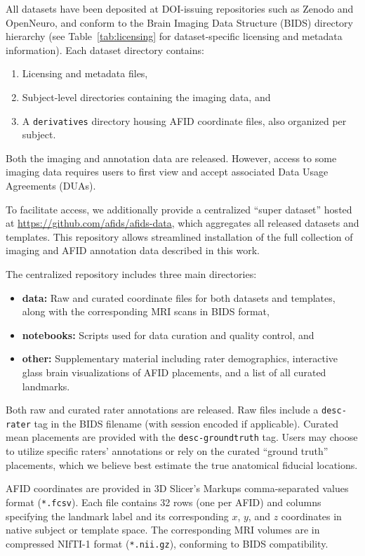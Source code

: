 All datasets have been deposited at DOI-issuing repositories such as Zenodo and OpenNeuro\cite{zenodo,openneuro1,openneuro2,openneuro3}, and conform to the Brain Imaging Data Structure (BIDS) directory hierarchy (see Table~\ref{tab:licensing} for dataset-specific licensing and metadata information). Each dataset directory contains: 
\begin{enumerate}
    \item Licensing and metadata files,
    \item Subject-level directories containing the imaging data, and
    \item A \texttt{derivatives} directory housing AFID coordinate files, also organized per subject.
\end{enumerate}
Both the imaging and annotation data are released. However, access to some imaging data requires users to first view and accept associated Data Usage Agreements (DUAs).

To facilitate access, we additionally provide a centralized “super dataset” hosted at \url{https://github.com/afids/afids-data}\cite{afidsdata}, which aggregates all released datasets and templates. This repository allows streamlined installation of the full collection of imaging and AFID annotation data described in this work.

The centralized repository includes three main directories:
\begin{itemize}
    \item \textbf{data:} Raw and curated coordinate files for both datasets and templates, along with the corresponding MRI scans in BIDS format,
    \item \textbf{notebooks:} Scripts used for data curation and quality control, and
    \item \textbf{other:} Supplementary material including rater demographics, interactive glass brain visualizations of AFID placements, and a list of all curated landmarks.
\end{itemize}

Both raw and curated rater annotations are released. Raw files include a \texttt{desc-rater} tag in the BIDS filename (with session encoded if applicable). Curated mean placements are provided with the \texttt{desc-groundtruth} tag. Users may choose to utilize specific raters’ annotations or rely on the curated “ground truth” placements, which we believe best estimate the true anatomical fiducial locations.

AFID coordinates are provided in 3D Slicer’s Markups comma-separated values format (\texttt{*.fcsv}). Each file contains 32 rows (one per AFID) and columns specifying the landmark label and its corresponding $x$, $y$, and $z$ coordinates in native subject or template space. The corresponding MRI volumes are in compressed NIfTI-1 format (\texttt{*.nii.gz}), conforming to BIDS compatibility.


